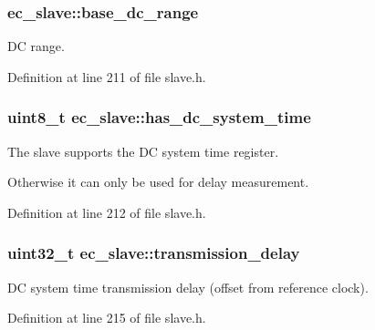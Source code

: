 \subsubsection[{base\-\_\-dc\-\_\-range}]{ {\bf ec\-\_\-slave\-::base\-\_\-dc\-\_\-range}}\label{structec__slave_a8bc5c82a2467c31b4c427fe4c56cb544}


\-D\-C range. 



\-Definition at line 211 of file slave.\-h.

\subsubsection[{has\-\_\-dc\-\_\-system\-\_\-time}]{\setlength{\rightskip}{0pt plus 5cm}uint8\-\_\-t {\bf ec\-\_\-slave\-::has\-\_\-dc\-\_\-system\-\_\-time}}\label{structec__slave_a65fba9aad1f196c6c43ba7dceecc15dd}


\-The slave supports the \-D\-C system time register. 

\-Otherwise it can only be used for delay measurement. 

\-Definition at line 212 of file slave.\-h.

\subsubsection[{transmission\-\_\-delay}]{\setlength{\rightskip}{0pt plus 5cm}uint32\-\_\-t {\bf ec\-\_\-slave\-::transmission\-\_\-delay}}\label{structec__slave_a0e5d719413436f927eba7320ee565125}


\-D\-C system time transmission delay (offset from reference clock). 



\-Definition at line 215 of file slave.\-h.

